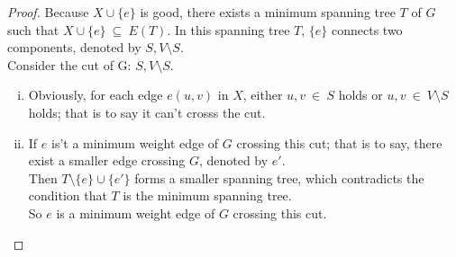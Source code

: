 \begin{proof}
	Because $X \cup \{e\}$ is good, there exists a minimum spanning tree $T$ of $G$ such that $X \cup \{e\}~\subseteq~E(T)$.
	In this spanning tree $T$, $\{e\}$ connects two components, denoted by $S, V \setminus S$. \\
	Consider the cut of G: $S, V \setminus S$.
	\begin{enumerate}[(i)]
		\item Obviously, for each edge $e(u,v)$ in $X$, either $u,v~\in~S$ holds or $u,v~\in~V\setminus S$ holds; that is to say it can't crosss the cut.
		\item If $e$ is't a minimum weight edge of $G$ crossing this cut; that is to say, there exist a smaller edge crossing $G$, denoted by $e'$.\\
			Then $T\setminus\{e\} \cup \{e'\}$ forms a smaller spanning tree, which contradicts the condition that $T$ is the minimum spanning tree.\\
			So $e$ is a minimum weight edge of $G$ crossing this cut.
	\end{enumerate}
\end{proof}
